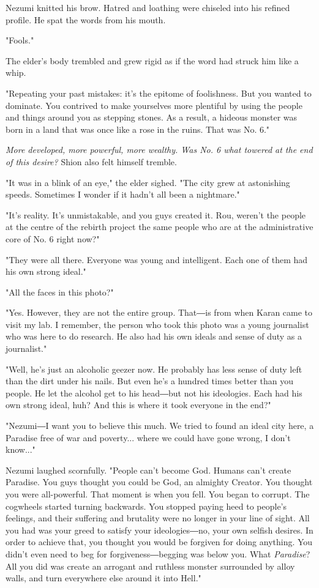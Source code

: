 Nezumi knitted his brow. Hatred and loathing were chiseled into his
refined profile. He spat the words from his mouth.

"Fools."

The elder's body trembled and grew rigid as if the word had struck him
like a whip.

"Repeating your past mistakes: it's the epitome of foolishness. But you
wanted to dominate. You contrived to make yourselves more plentiful by
using the people and things around you as stepping stones. As a result,
a hideous monster was born in a land that was once like a rose in the
ruins. That was No. 6."

\emph{More developed, more powerful, more wealthy. Was No. 6 what towered at
the end of this desire?} Shion also felt himself tremble.

"It was in a blink of an eye," the elder sighed. "The city grew at
astonishing speeds. Sometimes I wonder if it hadn't all been a
nightmare."

"It's reality. It's unmistakable, and you guys created it. Rou, weren't
the people at the centre of the rebirth project the same people who are
at the administrative core of No. 6 right now?"

"They were all there. Everyone was young and intelligent. Each one of
them had his own strong ideal."

"All the faces in this photo?"

"Yes. However, they are not the entire group. That―is from when Karan
came to visit my lab. I remember, the person who took this photo was a
young journalist who was here to do research. He also had his own ideals
and sense of duty as a journalist."

"Well, he's just an alcoholic geezer now. He probably has less sense of
duty left than the dirt under his nails. But even he's a hundred times
better than you people. He let the alcohol get to his head―but not his
ideologies. Each had his own strong ideal, huh? And this is where it
took everyone in the end?"

"Nezumi―I want you to believe this much. We tried to found an ideal city
here, a Paradise free of war and poverty... where we could have gone
wrong, I don't know..."

Nezumi laughed scornfully. "People can't become God. Humans can't create
Paradise. You guys thought you could be God, an almighty Creator. You
thought you were all-powerful. That moment is when you fell. You began
to corrupt. The cogwheels started turning backwards. You stopped paying
heed to people's feelings, and their suffering and brutality were no
longer in your line of sight. All you had was your greed to satisfy your
ideologies―no, your own selfish desires. In order to achieve that, you
thought you would be forgiven for doing anything. You didn't even need
to beg for forgiveness―begging was below you. What \emph{Paradise}? All you did
was create an arrogant and ruthless monster surrounded by alloy walls,
and turn everywhere else around it into Hell."

